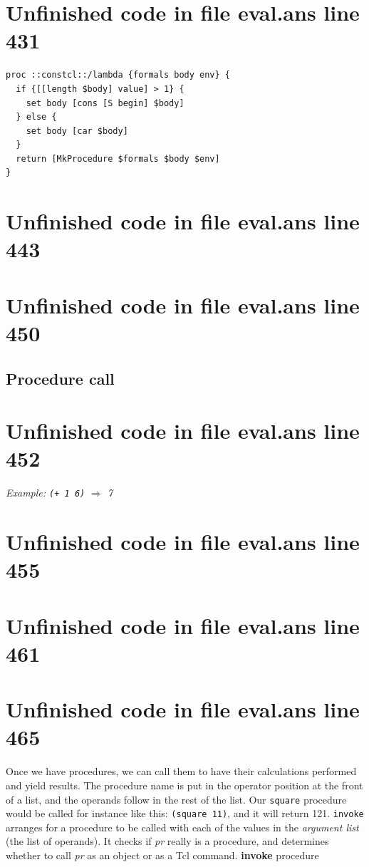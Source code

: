 \documentclass[twoside,9pt]{report}
\begin{document}
\section{Unfinished code in file eval.ans line 431}
\begin{lstlisting}
proc ::constcl::/lambda {formals body env} {
  if {[[length $body] value] > 1} {
    set body [cons [S begin] $body]
  } else {
    set body [car $body]
  }
  return [MkProcedure $formals $body $env]
}
\end{lstlisting}
\section{Unfinished code in file eval.ans line 443}
\section{Unfinished code in file eval.ans line 450}
\subsection{Procedure call}
\label{procedure-call}
\section{Unfinished code in file eval.ans line 452}


\emph{Example: \texttt{(+ 1 6)} $\Rightarrow$ 7}

\section{Unfinished code in file eval.ans line 455}
\section{Unfinished code in file eval.ans line 461}
\section{Unfinished code in file eval.ans line 465}

Once we have procedures, we can call them to have their calculations performed and yield results. The procedure name is put in the operator position at the front of a list, and the operands follow in the rest of the list. Our \texttt{square} procedure would be called for instance like this: \texttt{(square 11)}, and it will return 121. \texttt{invoke} arranges for a procedure to be called with each of the values in the \emph{argument list} (the list of operands). It checks if \emph{pr} really is a procedure, and determines whether to call \emph{pr} as an object or as a Tcl command. \textbf{invoke} procedure
\end{document}
